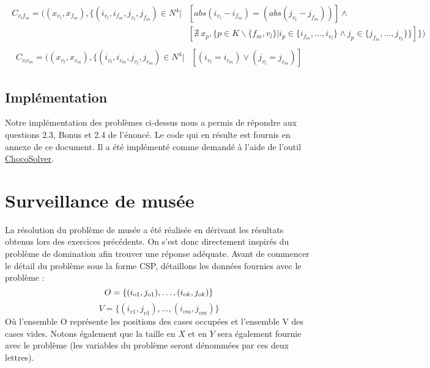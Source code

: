 \documentclass[a4paper]{article}
\begin{document}
\begin{align*}
\begin{split}
C_{v_lf_m} = ( (x_{v_l},x_{f_m}), \{ (i_{v_l},i_{f_m},j_{v_l},j_{f_m}) \in N^4 | &  [ abs(i_{v_l} - i_{f_m}) = (abs(j_{v_l} - j_{f_m})) ] \wedge \\
& [ \nexists \ x_p, \{ p \in K \backslash \{f_m,v_l\} | i_{p} \in \{ i_{f_m},...,i_{v_l} \} \wedge j_p \in \{ j_{f_m},...,j_{v_l} \}\}  ]  \} )
\end{split}
\end{align*}
\begin{align*}
\begin{split}
C_{v_lc_m} = ( (x_{v_l},x_{c_m}), \{ (i_{v_l},i_{c_m},j_{v_l},j_{c_m}) \in N^4 | &  [ (i_{v_l} = i_{c_m}) \vee(j_{v_l} = j_{c_m}) ]
\end{split}
\end{align*}

\subsection{Implémentation}
Notre implémentation des problèmes ci-dessus nous a permis de répondre aux questions 2.3, Bonus et 2.4 de l'énoncé. Le code qui en résulte est fournis en annexe de ce document. Il a été implémenté comme demandé à l'aide de l'outil \href{http://www.choco-solver.org/}{ChocoSolver}.

\section{Surveillance de musée}
La résolution du problème de musée a été réalisée en dérivant les résultats obtenus lors des exercices précédents. On s'est donc directement inspirés du problème de domination afin trouver une réponse adéquate. Avant de commencer le détail du problème sous la forme CSP, détaillons les données fournies avec le problème : 
\begin{equation*}
O = \{(i_{o1},j_{o1}),\ldots,(i_{ok},j_{ok}) \} \vspace{0.1cm} 
\end{equation*}
\begin{equation*}
V = \{ (i_{v1},j_{v1}),\ldots,(i_{vm},j_{vm}) \}
\end{equation*}
Où l'ensemble O représente les positions des cases occupées et l'ensemble V des cases vides. Notons également que la taille en $X$ et en $Y$ sera également fournie avec le problème (les variables du problème seront dénommées par ces deux lettres).
\end{document}

